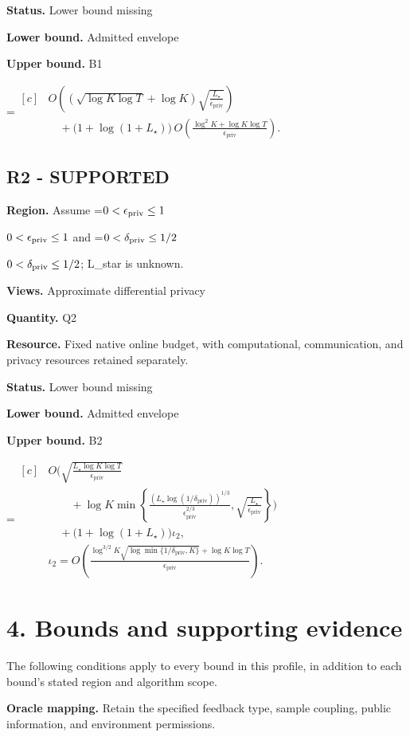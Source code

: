 \documentclass[10pt,a4paper]{article}
\newcommand{\AtlasMath}[1]{\par\begingroup\centering\setbox0=\hbox{$\displaystyle #1$}\ifdim\wd0>1.4\linewidth\typeout{ATLAS WIDE FORMULA: \the\wd0}\fi\ifdim\wd0>\linewidth\resizebox{\linewidth}{!}{\box0}\else\box0\fi\par\endgroup}
\newcommand{\AtlasInlineMath}[1]{\begingroup\setbox0=\hbox{$#1$}\ifdim\wd0>.4\linewidth\endgroup\AtlasMath{#1}\else\endgroup$#1$\fi}
\begin{document}
\textbf{Status.} Lower bound missing

\textbf{Lower bound.} Admitted envelope

\textbf{Upper bound.} B1

\AtlasMath{\begin{aligned}[c]&O\!\left((\sqrt{\log K\log T}+\log K)\sqrt{\frac{L_\star}{\epsilon_{\mathrm{priv}}}}\right)\\ &\quad+\bigl(1+\log(1+L_\star)\bigr)\,O\!\left(\frac{\log^2K+\log K\log T}{\epsilon_{\mathrm{priv}}}\right).\end{aligned}}
\subsection{R2 - SUPPORTED}
\textbf{Region.} Assume \AtlasInlineMath{0<\epsilon_{\rm priv}\le 1} and \AtlasInlineMath{0<\delta_{\rm priv}\le 1/2}; L\_star is unknown.

\textbf{Views.} Approximate differential privacy

\textbf{Quantity.} Q2

\textbf{Resource.} Fixed native online budget, with computational, communication, and privacy resources retained separately.

\textbf{Status.} Lower bound missing

\textbf{Lower bound.} Admitted envelope

\textbf{Upper bound.} B2

\AtlasMath{\begin{aligned}[c]&O\!\Bigg(\sqrt{\frac{L_\star\log K\log T}{\epsilon_{\mathrm{priv}}}}\\ &\qquad+\log K\min\!\left\{\frac{(L_\star\log(1/\delta_{\mathrm{priv}}))^{1/3}}{\epsilon_{\mathrm{priv}}^{2/3}},\sqrt{\frac{L_\star}{\epsilon_{\mathrm{priv}}}}\right\}\Bigg)\\ &\quad+\bigl(1+\log(1+L_\star)\bigr)\iota_2,\\ &\iota_2=O\!\left(\frac{\log^{3/2}K\sqrt{\log\min\{1/\delta_{\mathrm{priv}},K\}}+\log K\log T}{\epsilon_{\mathrm{priv}}}\right).\end{aligned}}
\section{4. Bounds and supporting evidence}
The following conditions apply to every bound in this profile, in addition to each bound's stated region and algorithm scope.

\textbf{Oracle mapping.} Retain the specified feedback type, sample coupling, public information, and environment permissions.
\end{document}
